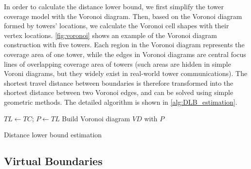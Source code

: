 In order to calculate the distance lower bound, 
we first simplify the tower coverage model with the Voronoi diagram. 
Then, based on the Voronoi diagram formed by towers' locations, we calculate the Voronoi cell shapes with their vertex locations. 
\autoref{fig:voronoi} shows an example of the Voronoi diagram construction with five towers. 
Each region in the Voronoi diagram represents the coverage area of one tower, while the edges in Voronoi diagrams are central focus lines of overlapping coverage area of towers (such areas are hidden in simple Voroni diagrams, but they widely exist in real-world tower communications).  
The shortest travel distance between boundaries is therefore transformed into the shortest distance between two Voronoi edges, 
and can be solved using simple geometric methods. The detailed algorithm is shown in \autoref{alg:DLB_estimation}.

\begin{algorithm}
 $TL \leftarrow TC$; $P \leftarrow TL$ \;
 Build Voronoi diagram $VD$ with $P$ \;
 \caption{Distance lower bound estimation}\label{alg:DLB_estimation}
\end{algorithm}


\subsection{Virtual Boundaries}

